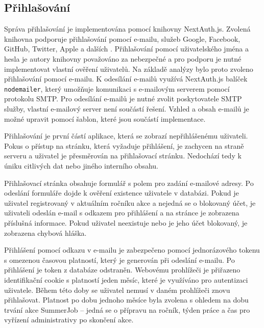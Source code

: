 \subsection{Přihlašování}

Správa přihlašování je implementována pomocí knihovny NextAuth.js. Zvolená knihovna podporuje
přihlašování pomocí e-mailu, služeb Google, Facebook, GitHub, Twitter, Apple a dalších \cite{nextauth}. Přihlašování pomocí uživatelského jména a hesla je autory knihovny 
považováno za nebezpečné a pro podporu je nutné implementovat vlastní ověření uživatelů. Na základě analýzy bylo proto zvoleno přihlašování pomocí e-mailu.
K odesílání e-mailů využívá NextAuth.js balíček \texttt{nodemailer}, který umožňuje komunikaci s e-mailovým serverem pomocí protokolu SMTP. Pro odesílání e-mailů je nutné
zvolit poskytovatele SMTP služby, vlastní e-mailový server není součástí řešení. Vzhled a obsah e-mailů je možné upravit pomocí šablon, které jsou součástí
implementace.

Přihlašování je první částí aplikace, která se zobrazí nepřihlášenému uživateli. Pokus o přístup na stránku, která vyžaduje přihlášení,
je zachycen na straně serveru a uživatel je přesměrován na přihlašovací stránku. Nedochází tedy k úniku citlivých dat nebo jiného interního obsahu.

Přihlašovací stránka obsahuje formulář s polem pro zadání e-mailové adresy. Po odeslání formuláře dojde k ověření existence uživatele v databázi.
Pokud je uživatel registrovaný v aktuálním ročníku akce a nejedná se o blokovaný účet, je uživateli odeslán e-mail s odkazem pro přihlášení a na stránce je 
zobrazena příslušná informace. Pokud uživatel neexistuje nebo je jeho účet blokovaný, je zobrazena chybová hláška.

Přihlášení pomocí odkazu v e-mailu je zabezpečeno pomocí jednorázového tokenu s omezenou časovou platností, který je generován při odeslání e-mailu.
Po přihlášení je token z databáze odstraněn.
Webovému prohlížeči je přiřazeno identifikační cookie s platností jeden měsíc, které je využíváno pro autentizaci uživatele. Během této doby se uživatel nemusí v
daném prohlížeči znovu přihlašovat. Platnost po dobu jednoho měsíce byla zvolena s ohledem na dobu trvání akce SummerJob -- jedná se o přípravu na ročník,
týden práce a čas pro vyřízení administrativy po skončení akce.

